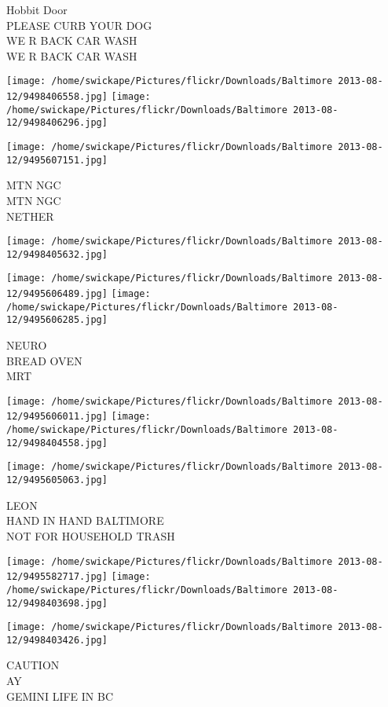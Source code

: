\documentclass[10pt,letterpaper]{article}
\begin{document}
Hobbit Door\\
PLEASE CURB YOUR DOG\\
WE R BACK CAR WASH\\
WE R BACK CAR WASH
\pagebreak

\texttt{[image: /home/swickape/Pictures/flickr/Downloads/Baltimore 2013-08-12/9498406558.jpg]}
\texttt{[image: /home/swickape/Pictures/flickr/Downloads/Baltimore 2013-08-12/9498406296.jpg]}

\texttt{[image: /home/swickape/Pictures/flickr/Downloads/Baltimore 2013-08-12/9495607151.jpg]}

MTN NGC\\
MTN NGC\\
NETHER
\pagebreak

\texttt{[image: /home/swickape/Pictures/flickr/Downloads/Baltimore 2013-08-12/9498405632.jpg]}

\vspace{0.25in}
\texttt{[image: /home/swickape/Pictures/flickr/Downloads/Baltimore 2013-08-12/9495606489.jpg]}
\texttt{[image: /home/swickape/Pictures/flickr/Downloads/Baltimore 2013-08-12/9495606285.jpg]}

NEURO\\
BREAD OVEN\\
MRT
\pagebreak

\texttt{[image: /home/swickape/Pictures/flickr/Downloads/Baltimore 2013-08-12/9495606011.jpg]}
\texttt{[image: /home/swickape/Pictures/flickr/Downloads/Baltimore 2013-08-12/9498404558.jpg]}

\vspace{0.25in}
\texttt{[image: /home/swickape/Pictures/flickr/Downloads/Baltimore 2013-08-12/9495605063.jpg]}

LEON\\
HAND IN HAND BALTIMORE\\
NOT FOR HOUSEHOLD TRASH
\pagebreak

\texttt{[image: /home/swickape/Pictures/flickr/Downloads/Baltimore 2013-08-12/9495582717.jpg]}
\texttt{[image: /home/swickape/Pictures/flickr/Downloads/Baltimore 2013-08-12/9498403698.jpg]}

\texttt{[image: /home/swickape/Pictures/flickr/Downloads/Baltimore 2013-08-12/9498403426.jpg]}

CAUTION\\
AY\\
GEMINI LIFE IN BC
\pagebreak
\end{document}
